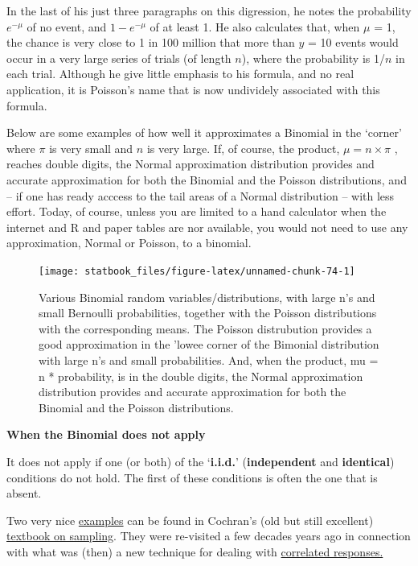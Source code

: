 \documentclass[]{book}
\begin{document}
In the last of his just three paragraphs on this digression, he notes the probability \(e^{-\mu}\) of no event, and \(1 - e^{-\mu}\) of at least 1.
He also calculates that, when \(\mu\) = 1, the chance is very close to 1 in 100 million that more than \(y\) = 10 events would occur in a very large series of trials (of length \(n\)), where the probability is 1/\(n\) in each trial. Although he give little emphasis to his formula, and no real application, it is Poisson's name that is now undividely associated with this formula.

Below are some examples of how well it approximates a Binomial in the `corner' where \(\pi\) is very small and \(n\) is very large. If, of course, the product, \(\mu = n \times \pi\) , reaches double digits, the Normal approximation distribution provides and accurate approximation for both the Binomial and the Poisson distributions, and -- if one has ready acccess to the tail areas of a Normal distribution -- with less effort. Today, of course, unless you are limited to a hand calculator when the internet and R and paper tables are nor available, you would not need to use any approximation, Normal or Poisson, to a binomial.

\begin{figure}

\texttt{[image: statbook\_files/figure-latex/unnamed-chunk-74-1]} \hfill{}

\caption{Various Binomial random variables/distributions, with large n's and small Bernoulli probabilities, together with the Poisson distributions with the corresponding means. The Poisson distrubution provides a good approximation in the 'lowee corner of the Bimonial distribution with large n's and small probabilities. And, when the product, mu = n * probability, is in the double digits, the Normal approximation distribution provides and accurate approximation for both the Binomial and the Poisson distributions.}\label{fig:unnamed-chunk-74}
\end{figure}

\textbf{When the Binomial does not apply}

It does not apply if one (or both) of the `\textbf{i.i.d.}' (\textbf{independent} and \textbf{identical}) conditions do not hold. The first of these conditions is often the one that is absent.

Two very nice \href{http://www.biostat.mcgill.ca/hanley/statbook/CochranTable.png}{examples} can be found in Cochran's (old but still excellent) \href{http://www.biostat.mcgill.ca/hanley/statbook/Cochran3rdEdition.png}{textbook on sampling}. They were re-visited a few decades years ago in connection with what was (then) a new technique for dealing with
\href{http://www.medicine.mcgill.ca/epidemiology/hanley/Reprints/sim.pdf\#page=2}{correlated responses.}
\end{document}
